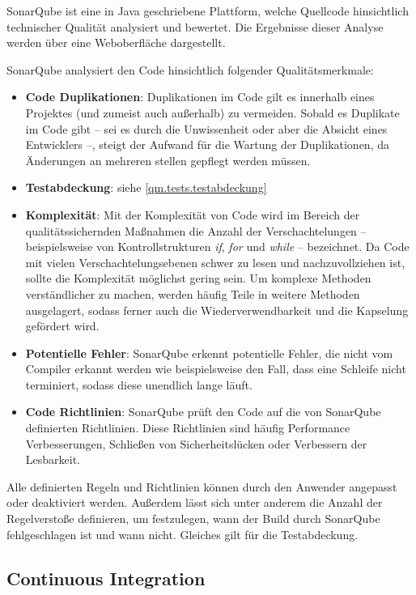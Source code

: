 			SonarQube ist eine in Java geschriebene Plattform, welche Quellcode hinsichtlich technischer Qualität analysiert und bewertet. Die Ergebnisse dieser Analyse werden über eine Weboberfläche dargestellt. \cite{A.2142020} 
			
			SonarQube analysiert den Code hinsichtlich folgender Qualitätsmerkmale:
			
			\begin{itemize}
				\item \textbf{Code Duplikationen}: Duplikationen im Code gilt es innerhalb eines Projektes (und zumeist auch außerhalb) zu vermeiden. Sobald es Duplikate im Code gibt -- sei es durch die Unwissenheit oder aber die Absicht eines Entwicklers --, steigt der Aufwand für die Wartung der Duplikationen, da Änderungen an mehreren stellen gepflegt werden müssen.
				\item \textbf{Testabdeckung}: siehe \autoref{qm.tests.testabdeckung}
				\item \textbf{Komplexität}: Mit der Komplexität von Code wird im Bereich der qualitätssichernden Maßnahmen die Anzahl der Verschachtelungen -- beispielsweise von Kontrollstrukturen \textit{if}, \textit{for} und \textit{while} -- bezeichnet. Da Code mit vielen Verschachtelungsebenen schwer zu lesen und nachzuvollziehen ist, sollte die Komplexität möglichst gering sein. Um komplexe Methoden verständlicher zu machen, werden häufig Teile in weitere Methoden ausgelagert, sodass ferner auch die Wiederverwendbarkeit und die Kapselung gefördert wird. 
				\item \textbf{Potentielle Fehler}: SonarQube erkennt potentielle Fehler, die nicht vom Compiler erkannt werden wie beispielsweise den Fall, dass eine Schleife nicht terminiert, sodass diese unendlich lange läuft. 
				\item \textbf{Code Richtlinien}: SonarQube prüft den Code auf die von SonarQube definierten Richtlinien. Diese Richtlinien sind häufig Performance Verbesserungen, Schließen von Sicherheitslücken oder Verbessern der Lesbarkeit. 
			\end{itemize}
		
			Alle definierten Regeln und Richtlinien können durch den Anwender angepasst oder deaktiviert werden. Außerdem lässt sich unter anderem die Anzahl der Regelverstoße definieren, um festzulegen, wann der Build durch SonarQube fehlgeschlagen ist und wann nicht. Gleiches gilt für die Testabdeckung. 
		
		\subsection{Continuous Integration}
		
